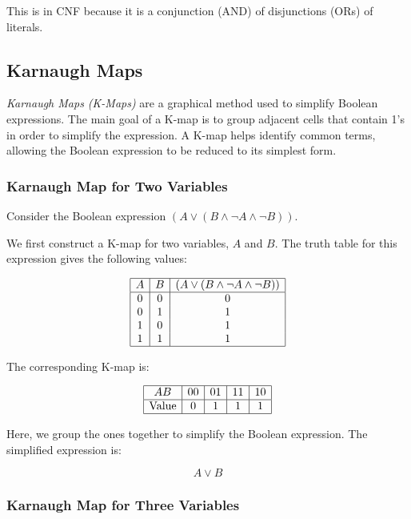 This is in CNF because it is a conjunction (AND) of disjunctions (ORs) of literals.

\subsection{Karnaugh Maps}

\emph{Karnaugh Maps (K-Maps)} are a graphical method used to simplify Boolean expressions. 
The main goal of a K-map is to group adjacent cells that contain 1's in order to simplify the expression. 
A K-map helps identify common terms, allowing the Boolean expression to be reduced to its simplest form.

\subsubsection{Karnaugh Map for Two Variables}

Consider the Boolean expression \( (A \lor (B \land \neg A \land \neg B)) \).
\vspace{\baselineskip}

We first construct a K-map for two variables, \(A\) and \(B\). The truth table for this expression 
gives the following values:

\[
	\begin{array}{|c|c|c|}
		\hline
		A & B & (A \lor (B \land \neg A \land \neg B)) \\
		\hline
		0 & 0 & 0                                      \\
		0 & 1 & 1                                      \\
		1 & 0 & 1                                      \\
		1 & 1 & 1                                      \\
		\hline
	\end{array}
\]

The corresponding K-map is:

\[
	\begin{array}{|c|c|c|c|c|}
		\hline
		AB           & 00 & 01 & 11 & 10 \\
		\hline
		\text{Value} & 0  & 1  & 1  & 1  \\
		\hline
	\end{array}
\]

Here, we group the ones together to simplify the Boolean expression. The simplified expression is:

\[
	A \lor B
\]

\subsubsection{Karnaugh Map for Three Variables}

